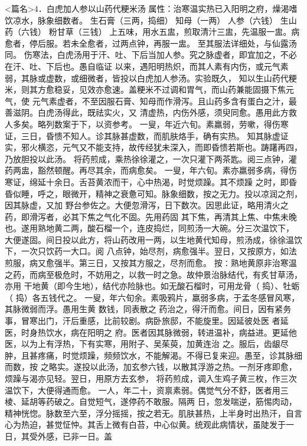 \documentclass[a4paper,12pt,UTF8,twoside]{ctexbook}
\begin{document}
<篇名>4．白虎加人参以山药代粳米汤
属性：治寒温实热已入阳明之府，燥渴嗜饮凉水，脉象细数者。 
生石膏（三两，捣细） 知母（一两） 人参（六钱） 生山药（六钱） 粉甘草（三钱） 
上五味，用水五盅，煎取清汁三盅，先温服一盅。病愈者，停后服。若未全愈者，过两点钟，再服一盅。 
至其服法详细处，与仙露汤同。 
伤寒法，白虎汤用于汗、吐、下后当加人参。究之脉虚者，即宜加之，不必在汗、吐、下后也。愚自临证 
以来，遇阳明热炽，而其人素有内伤，或元气素弱，其脉或虚数，或细微者，皆投以白虎加人参汤。实验既久， 
知以生山药代粳米，则其方愈稳妥，见效亦愈速。盖粳米不过调和胃气，而山药兼能固摄下焦元气，使 
元气素虚者，不至因服石膏、知母而作滑泻。且山药多含有蛋白之汁，最善滋阴。白虎汤得此，既祛实火，又 
清虚热，内伤外感，须臾同愈。愚用此方救人多矣。略列数案于下，以资参考。 
一叟，年近六旬。素羸弱，劳嗽，得伤寒证，三日，昏愦不知人。诊其脉甚虚数，而肌肤烙手，确有实热。 
知其脉虚证实，邪火横恣，元气又不能支持，故传经犹未深入，而即昏愦若斯也。踌躇再四，乃放胆投以此汤。 
将药煎成，乘热徐徐灌之，一次只灌下两茶匙。阅三点钟，灌药两盅，豁然顿醒。再尽其余，而病愈矣。 
一叟，年六旬。素亦羸弱多病，得伤寒证，绵延十余日。舌苔黄浓而干，心中热渴，时觉烦躁。其不烦躁 
之时，即昏昏似睡，呼之，眼微开，精神之衰惫可知。脉象细数，按之无力。投以凉润之剂，因其脉虚，又加 
野台参佐之。大便忽滑泻，日下数次。因思此证，略用清火之药，即滑泻者，必其下焦之气化不固。先用药固 
其下焦，再清其上焦、中焦未晚也。遂用熟地黄二两，酸石榴一个，连皮捣烂，同煎汤一大碗。分三次温饮下， 
大便遂固。间日投以此方，将山药改用一两，以生地黄代知母，煎汤成，徐徐温饮下，一次只饮药一大口。阅 
八点钟，始尽剂，病愈强半。翌日，又按原方，如法煎服，病又愈强半。第三日，又按其方服之，尽剂而愈。 
按∶熟地黄原非治寒温之药，而病至极危时，不妨用之，以救一时之急。故仲景治脉结代，有炙甘草汤，亦用 
干地黄（即今生地），结代亦险脉也。如无酸石榴时，可用龙骨（ 捣）、牡蛎（ 捣）各五钱代之。 
一叟，年六旬余。素吸鸦片，羸弱多病，于孟冬感冒风寒，其脉微弱而浮。愚用生黄 数钱，同表散之 
药治之，得汗而愈。间日，因有紧务事，冒寒出门，汗后重感，比前较剧。病卧旅邸，不能旋里。因延彼处医 
者延医，时身热饮水，病在阳明之 
府。医者因其脉微弱，转进温补，病益进。更延他医，以为上有浮热，下有实寒，用附子、吴茱萸，加黄连治 
之。服后，齿龈尽肿，且甚疼痛，时觉烦躁，频频饮水，不能解渴。不得已复来迎。愚至，诊其脉细而数，按 
之略实。遂投以此汤，加玄参六钱，以散其浮游之热。一剂牙疼即愈，烦躁与渴亦见轻。翌日，用原方去玄参， 
将药煎成，调入生鸡子黄三枚，作三次温饮下，大便得通而愈。 
一人，年二十，资禀素弱。偶觉气分不舒，医者用三棱、延胡等药破之。自觉短气，遂停药不敢服。隔两 
日，忽发喘逆，筋惕肉动，精神恍惚。脉数至六至，浮分摇摇，按之若无。肌肤甚热，上半身时出热汗，自言 
心为热迫，甚觉怔忡。其舌上微有白苔，中心似黄。统观此病情状，虽陡发于一日，其受外感，已非一日。盖 
\end{document}
